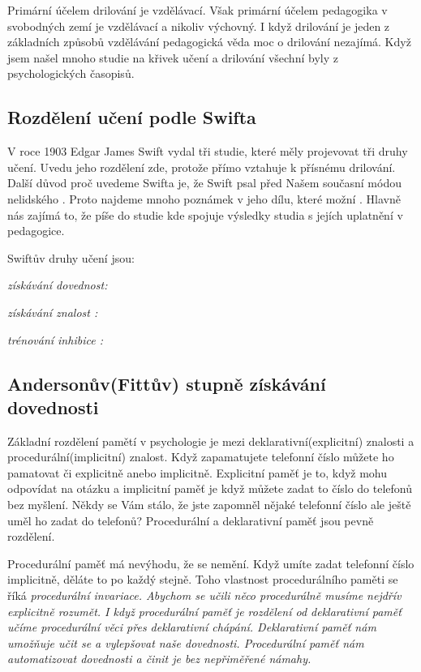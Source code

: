 Primární účelem drilování je vzdělávací.  Však primární účelem pedagogika v svobodných zemí je vzdělávací a nikoliv výchovný. I když drilování je jeden z základních způsobů vzdělávání pedagogická věda moc o drilování nezajímá. Když jsem našel mnoho studie na křivek učení a drilování všechní byly z psychologických časopisů.

\subsection{Rozdělení učení podle Swifta}

V roce 1903 Edgar James Swift vydal tři studie, které měly projevovat tři druhy učení. Uvedu jeho rozdělení zde, protože přímo vztahuje k přísnému drilování.  Další důvod proč uvedeme Swifta je, že Swift psal před Našem současní módou nelidského .  Proto najdeme mnoho poznámek v jeho dílu, které možní .  Hlavně nás zajímá to, že píše do studie  kde spojuje výsledky studia s jejích uplatnění v pedagogice. %

Swiftův druhy učení jsou:

\em získávání dovednost\em : %

\em získávání znalost \em : %

\em trénování inhibice \em : %

\citep[str.201,]{swift1903studies}

\subsection{Andersonův(Fittův) stupně získávání dovednosti} %

Základní rozdělení pamětí v psychologie je mezi deklarativní(explicitní) znalosti a procedurální(implicitní) znalost.  Když zapamatujete telefonní číslo můžete ho pamatovat či explicitně anebo implicitně. Explicitní paměť je to, když mohu odpovídat na otázku  a implicitní paměť je když můžete zadat to číslo do telefonů bez myšlení. Někdy se Vám stálo, že jste zapomněl nějaké telefonní číslo ale ještě uměl ho zadat do telefonů?  Procedurální a deklarativní paměť jsou pevně rozdělení.

Procedurální paměť má nevýhodu, že se nemění.  Když umíte zadat telefonní číslo implicitně, děláte to po každý stejně.  Toho vlastnost procedurálního paměti se říká \em procedurální invariace\em . Abychom se učili něco procedurálně musíme nejdřív explicitně rozumět.  I když procedurální paměť je rozdělení od deklarativní paměť učíme procedurální věci přes deklarativní chápání.  Deklarativní paměť nám umožňuje učit se a vylepšovat naše dovednosti.  Procedurální paměť nám automatizovat dovednosti a činit je bez nepřiměřené námahy\citep[str. 105]{robert1994handbook}.

